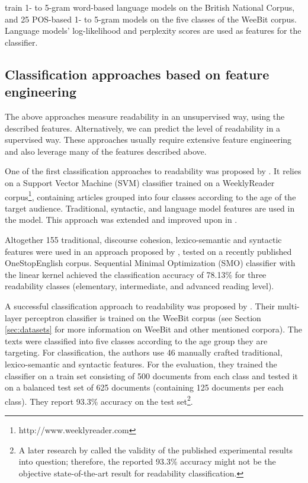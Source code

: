 \documentclass{clv3}
\begin{document}
\citet{xia2016text} train 1- to 5-gram word-based language models on the British National Corpus, and 25 POS-based 1- to 5-gram models on the five classes of the WeeBit corpus. Language models' log-likelihood and perplexity scores are used as features for the classifier. 



\subsection{Classification approaches based on feature engineering}
\label{sec:traditional-classification}

The above approaches measure readability in an unsupervised way, using the described features. Alternatively, we can predict the level of readability in a supervised way. These approaches usually require extensive feature engineering and also leverage many of the features described above.

One of the first classification approaches to readability was proposed by \citet{schwarm2005reading}. It relies on a Support Vector Machine (SVM) classifier trained on a WeeklyReader corpus\footnote{http://www.weeklyreader.com}, containing articles grouped into four classes according to the age of the target audience. Traditional, syntactic, and language model features are used in the model. This approach was extended and improved upon in \citet{petersen2009machine}. 

Altogether 155 traditional, discourse cohesion, lexico-semantic and syntactic features were used in an approach proposed by \citet{vajjala2018onestopenglish}, tested on a recently published OneStopEnglish corpus. Sequential Minimal Optimization (SMO) classifier with the linear kernel achieved the classification accuracy of 78.13\% for three readability classes (elementary, intermediate, and advanced reading level). 

A successful classification approach to readability was proposed by \citet{vajjala2012improving}. Their multi-layer perceptron classifier is trained on the WeeBit corpus \citep{vajjala2012improving} (see Section \ref{sec:datasets} for more information on WeeBit and other mentioned corpora). The texts were classified into five classes according to the age group they are targeting. For classification, the authors use 46 manually crafted traditional, lexico-semantic and syntactic features. For the evaluation, they trained the classifier on a train set consisting of 500 documents from each class and tested it on a balanced test set of 625 documents (containing 125 documents per each class). They report 
93.3\% accuracy on the test set\footnote{A later research by \citet{xia2016text} called the validity of the published experimental results into question; therefore, the reported 93.3\% accuracy might not be the objective state-of-the-art result for readability classification.}. 
\end{document}
